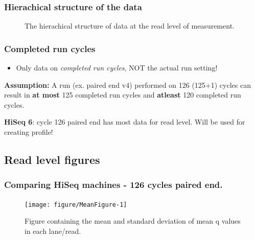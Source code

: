 \documentclass[10pt]{beamer}\usepackage[]{graphicx}\usepackage[]{color}
\newenvironment{knitrout}{}{} %
\begin{document}
\begin{frame}\frametitle{Hierachical structure of the data}
\begin{center}
\begin{figure}[!ht]
 \caption{The hierachical structure of data at the read level of measurement.}
\end{figure}
\end{center}
\end{frame}

 \begin{frame}\frametitle{Completed run cycles}
 \begin{itemize}
 \item Only data on \textit{completed run cycles}, NOT the actual run setting! 
 \end{itemize}
 \pause

 \textbf{Assumption:}
 \pause
A run (ex. paired end v4) performed on 126 (125+1) cycles can result in \textbf{at most} 125 completed run cycles and \textbf{atleast} 120 completed run cycles.

\textbf{HiSeq 6}: cycle 126 paired end has most data for read level. Will be used for creating profile!
\end{frame}

\subsection{Read level figures}
\begin{frame}\frametitle{Comparing HiSeq machines - 126 cycles paired end.}
\begin{knitrout}
\color{fgcolor}\begin{figure}
\texttt{[image: figure/MeanFigure-1]} \caption[Figure containing the mean and standard deviation of mean q values in each lane/read]{Figure containing the mean and standard deviation of mean q values in each lane/read.}\label{fig:MeanFigure}
\end{figure}


\end{knitrout}
\end{frame}
\end{document}
